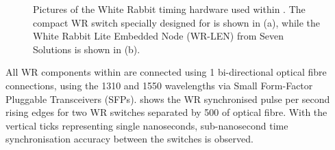 \begin{figure} %
    \centering
    \quad
    \caption[Pictures of the White Rabbit timing hardware used within \chipsfive]
    {Pictures of the White Rabbit timing hardware used within \chipsfive. The compact WR switch
        specially designed for \chips is shown in (a), while the White Rabbit Lite Embedded Node
        (WR-LEN) from Seven Solutions is shown in (b).}
    \label{fig:wr_electronics}
\end{figure}

All WR components within \chipsfive are connected using \SI{1}{} bi-directional optical
fibre connections, using the \SI{1310}{} and \SI{1550}{} wavelengths via Small
Form-Factor Pluggable Transceivers (SFPs).  shows the WR synchronised pulse
per second rising edges for two \chipsfive WR switches separated by \SI{500}{} of optical
fibre. With the vertical ticks representing single nanoseconds, sub-nanosecond time
synchronisation accuracy between the switches is observed.

